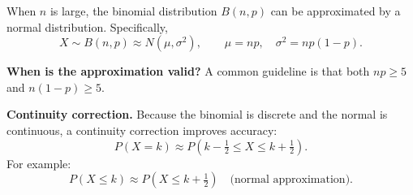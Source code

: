 
When $n$ is large, the binomial distribution $B(n,p)$ can be approximated by a normal distribution. Specifically,
\[
X \sim B(n,p) \approx N\!\left(\mu, \sigma^2\right), \qquad \mu = np, \quad \sigma^2 = np(1-p).
\]

\textbf{When is the approximation valid?} A common guideline is that both $np \geq 5$ and $n(1-p) \geq 5$.

\textbf{Continuity correction.} Because the binomial is discrete and the normal is continuous, a continuity correction improves accuracy:
\[
P(X = k) \approx P\!\left(k - \tfrac{1}{2} \leq X \leq k + \tfrac{1}{2}\right).
\]
For example:
\[
P(X \leq k) \approx P\!\left(X \leq k + \tfrac{1}{2}\right) \quad \text{(normal approximation)}.
\]

